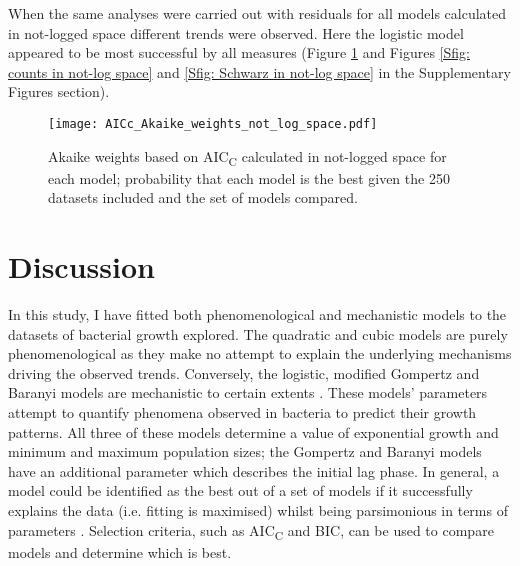 \documentclass[11pt]{article}
\begin{document}
\begin{linenumbers}
        When the same analyses were carried out with residuals for all models calculated in not-logged space different trends were observed. Here the logistic model appeared to be most successful by all measures (Figure \ref{fig: Akaike in not-log space} and Figures \ref{Sfig: counts in not-log space} and \ref{Sfig: Schwarz in not-log space} in the Supplementary Figures section).
        
        \begin{figure}[ht!]
            \centering
            \texttt{[image: AICc\_Akaike\_weights\_not\_log\_space.pdf]}
            \caption{Akaike weights based on AIC\textsubscript{C} calculated in not-logged space for each model; probability that each model is the best given the 250 datasets included and the set of models compared.}
            \label{fig: Akaike in not-log space}
        \end{figure}


    \section{Discussion}
    
        In this study, I have fitted both phenomenological and mechanistic models to the datasets of bacterial growth explored. The quadratic and cubic models are purely phenomenological as they make no attempt to explain the underlying mechanisms driving the observed trends. Conversely, the logistic, modified Gompertz and Baranyi models are mechanistic to certain extents \citep{ferrer_mathematical_2009}. These models' parameters attempt to quantify phenomena observed in bacteria to predict their growth patterns. All three of these models determine a value of exponential growth and minimum and maximum population sizes; the Gompertz and Baranyi models have an additional parameter which describes the initial lag phase. In general, a model could be identified as the best out of a set of models if it successfully explains the data (i.e. fitting is maximised) whilst being parsimonious in terms of parameters \citep{johnson_model_2004}. Selection criteria, such as AIC\textsubscript{C} and BIC, can be used to compare models and determine which is best.
        

\end{linenumbers}
\end{document}
